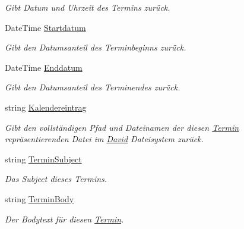 \begin{DoxyCompactItemize}
\begin{DoxyCompactList}\small\item\em Gibt Datum und Uhrzeit des Termins zurück. \end{DoxyCompactList}\item 
Date\+Time \hyperlink{class_products_1_1_model_1_1_entities_1_1_servicetermin_a35978d3b6057936a8582f9ba8a623161}{Startdatum}
\begin{DoxyCompactList}\small\item\em Gibt den Datumsanteil des Terminbeginns zurück. \end{DoxyCompactList}\item 
Date\+Time \hyperlink{class_products_1_1_model_1_1_entities_1_1_servicetermin_a8833882ddb322b509cb73b0cf2f44f65}{Enddatum}
\begin{DoxyCompactList}\small\item\em Gibt den Datumsanteil des Terminendes zurück. \end{DoxyCompactList}\item 
string \hyperlink{class_products_1_1_model_1_1_entities_1_1_servicetermin_a91d8b5cfe730f3af79c023dd5ad21659}{Kalendereintrag}
\begin{DoxyCompactList}\small\item\em Gibt den vollständigen Pfad und Dateinamen der diesen \hyperlink{class_products_1_1_model_1_1_entities_1_1_termin}{Termin} repräsentierenden Datei im \hyperlink{namespace_david}{David} Dateisystem zurück. \end{DoxyCompactList}\item 
string \hyperlink{class_products_1_1_model_1_1_entities_1_1_servicetermin_a2a41b89c6bbf202e2159dd17137ff6c1}{Termin\+Subject}
\begin{DoxyCompactList}\small\item\em Das Subject dieses Termins. \end{DoxyCompactList}\item 
string \hyperlink{class_products_1_1_model_1_1_entities_1_1_servicetermin_ab98abfbe8efceb4ef50973768796aab8}{Termin\+Body}
\begin{DoxyCompactList}\small\item\em Der Bodytext für diesen \hyperlink{class_products_1_1_model_1_1_entities_1_1_termin}{Termin}. \end{DoxyCompactList}\item 

\end{DoxyCompactItemize}
